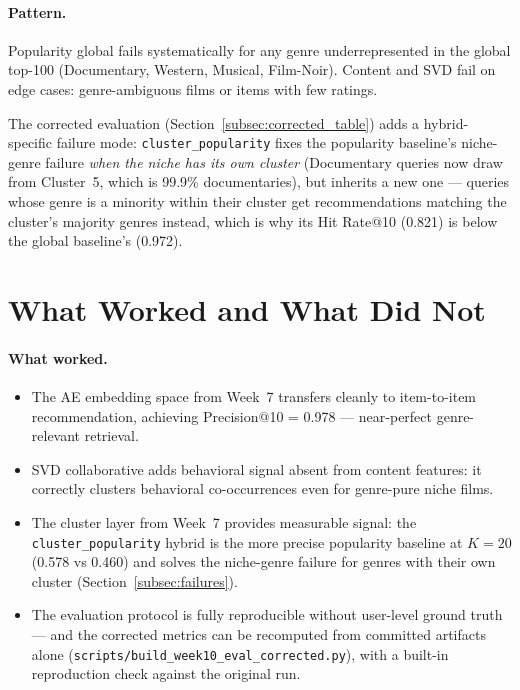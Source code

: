 \documentclass[12pt,a4paper]{article}
\begin{document}
\paragraph{Pattern.} Popularity global fails systematically for any genre underrepresented in
the global top-100 (Documentary, Western, Musical, Film-Noir). Content and SVD fail on edge cases:
genre-ambiguous films or items with few ratings.

The corrected evaluation (Section~\ref{subsec:corrected_table}) adds a hybrid-specific
failure mode: \texttt{cluster\_popularity} fixes the popularity baseline's niche-genre
failure \emph{when the niche has its own cluster} (Documentary queries now draw from
Cluster~5, which is 99.9\% documentaries), but inherits a new one --- queries whose genre is
a minority within their cluster get recommendations matching the cluster's majority genres
instead, which is why its Hit Rate@10 (0.821) is below the global baseline's (0.972).

\section{What Worked and What Did Not}
\label{sec:worked}

\paragraph{What worked.}
\begin{itemize}[nosep]
  \item The AE embedding space from Week~7 transfers cleanly to item-to-item recommendation,
    achieving Precision@10 = 0.978 --- near-perfect genre-relevant retrieval.
  \item SVD collaborative adds behavioral signal absent from content features:
    it correctly clusters behavioral co-occurrences even for genre-pure niche films.
  \item The cluster layer from Week~7 provides measurable signal: the
    \texttt{cluster\_popularity} hybrid is the more precise popularity baseline at $K=20$
    (0.578 vs 0.460) and solves the niche-genre failure for genres with their own cluster
    (Section~\ref{subsec:failures}).
  \item The evaluation protocol is fully reproducible without user-level ground truth ---
    and the corrected metrics can be recomputed from committed artifacts alone
    (\texttt{scripts/build\_week10\_eval\_corrected.py}), with a built-in reproduction check
    against the original run.
\end{itemize}
\end{document}
